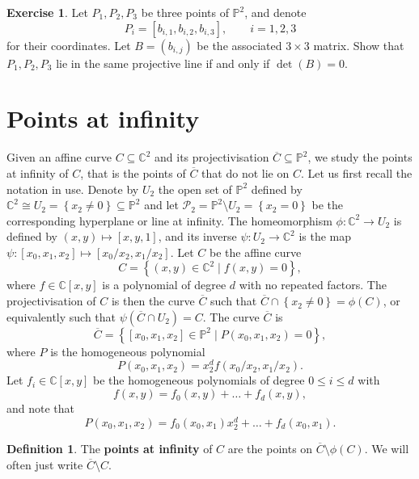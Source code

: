 \documentclass{article}
\newcommand{\C}{\mathbb{C}}
\renewcommand{\P}{\mathbb{P}}
\newcommand{\rb}[1]{\left( #1 \right)}
\renewcommand{\sb}[1]{\left[ #1 \right]}
\newcommand{\cb}[1]{\left\{ #1 \right\}}
\theoremstyle{definition}\newtheorem{definition}{Definition}[section]
\theoremstyle{definition}\newtheorem{notation}[definition]{Notation}
\theoremstyle{definition}\newtheorem{remark}[definition]{Remark}
\theoremstyle{definition}\newtheorem{example}[definition]{Example}
\theoremstyle{definition}\newtheorem{fact}{Fact}
\theoremstyle{definition}\newtheorem{exercise}{Exercise}
\begin{document}
\begin{exercise}
Let $ P_1, P_2, P_3 $ be three points of $ \P^2 $, and denote
$$ P_i = \sb{b_{i, 1}, b_{i, 2}, b_{i, 3}}, \qquad i = 1, 2, 3 $$
for their coordinates. Let $ B = \rb{b_{i, j}} $ be the associated $ 3 \times 3 $ matrix. Show that $ P_1, P_2, P_3 $ lie in the same projective line if and only if $ \det\rb{B} = 0 $.
\end{exercise}

\section{Points at infinity}

Given an affine curve $ C \subseteq \C^2 $ and its projectivisation $ \overline{C} \subseteq \P^2 $, we study the points at infinity of $ C $, that is the points of $ \overline{C} $ that do not lie on $ C $. Let us first recall the notation in use. Denote by $ U_2 $ the open set of $ \P^2 $ defined by $ \C^2 \cong U_2 = \cb{x_2 \ne 0} \subseteq \P^2 $ and let $ \mathcal{P}_2 = \P^2 \setminus U_2 = \cb{x_2 = 0} $ be the corresponding hyperplane or line at infinity. The homeomorphism $ \phi : \C^2 \to U_2 $ is defined by $ \rb{x, y} \mapsto \sb{x, y, 1} $, and its inverse $ \psi : U_2 \to \C^2 $ is the map $ \psi : \sb{x_0, x_1, x_2} \mapsto \sb{x_0 / x_2, x_1 / x_2} $. Let $ C $ be the affine curve
$$ C = \cb{\rb{x, y} \in \C^2 \mid f\rb{x, y} = 0}, $$
where $ f \in \C\sb{x, y} $ is a polynomial of degree $ d $ with no repeated factors. The projectivisation of $ C $ is then the curve $ \overline{C} $ such that $ \overline{C} \cap \cb{x_2 \ne 0} = \phi\rb{C} $, or equivalently such that $ \psi\rb{\overline{C} \cap U_2} = C $. The curve $ \overline{C} $ is
$$ \overline{C} = \cb{\sb{x_0, x_1, x_2} \in \P^2 \mid P\rb{x_0, x_1, x_2} = 0}, $$
where $ P $ is the homogeneous polynomial
$$ P\rb{x_0, x_1, x_2} = x_2^df\rb{x_0 / x_2, x_1 / x_2}. $$
Let $ f_i \in \C\sb{x, y} $ be the homogeneous polynomials of degree $ 0 \le i \le d $ with
$$ f\rb{x, y} = f_0\rb{x, y} + \dots + f_d\rb{x, y}, $$
and note that
$$ P\rb{x_0, x_1, x_2} = f_0\rb{x_0, x_1}x_2^d + \dots + f_d\rb{x_0, x_1}. $$

\begin{definition}
The \textbf{points at infinity} of $ C $ are the points on $ \overline{C} \setminus \phi\rb{C} $. We will often just write $ \overline{C} \setminus C $.
\end{definition}
\end{document}
